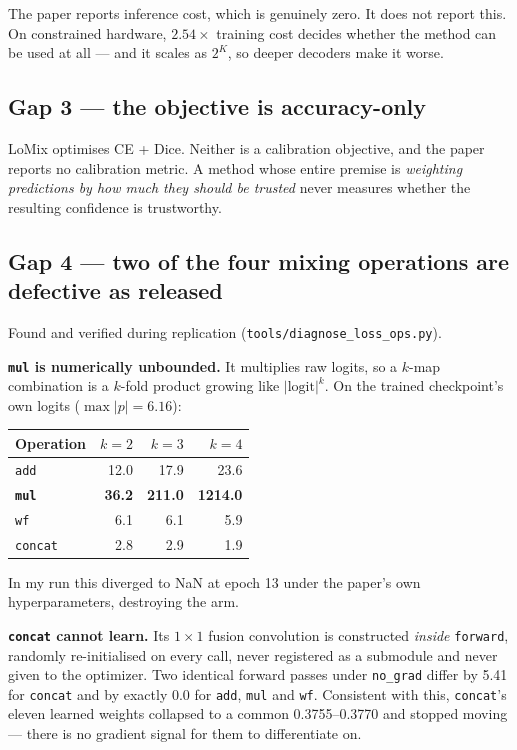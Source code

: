 \documentclass[11pt,a4paper]{article}
\newcommand{\code}[1]{\texttt{\small #1}}
\begin{document}
The paper reports inference cost, which is genuinely zero. It does not report
this. On constrained hardware, $2.54\times$ training cost decides whether the
method can be used at all --- and it scales as $2^K$, so deeper decoders make it
worse.

\subsection{Gap 3 --- the objective is accuracy-only}

LoMix optimises CE + Dice. Neither is a calibration objective, and the paper
reports no calibration metric. A method whose entire premise is \emph{weighting
predictions by how much they should be trusted} never measures whether the
resulting confidence is trustworthy.

\subsection{Gap 4 --- two of the four mixing operations are defective as released}

Found and verified during replication (\code{tools/diagnose\_loss\_ops.py}).

\textbf{\code{mul} is numerically unbounded.} It multiplies raw logits, so a
$k$-map combination is a $k$-fold product growing like $|\text{logit}|^k$. On
the trained checkpoint's own logits ($\max|p| = 6.16$):

\begin{center}
\begin{tabular}{@{}lrrr@{}}
\toprule
\textbf{Operation} & $k=2$ & $k=3$ & $k=4$ \\
\midrule
\code{add} & 12.0 & 17.9 & 23.6 \\
\textbf{\code{mul}} & \textbf{36.2} & \textbf{211.0} & \textbf{1214.0} \\
\code{wf} & 6.1 & 6.1 & 5.9 \\
\code{concat} & 2.8 & 2.9 & 1.9 \\
\bottomrule
\end{tabular}
\end{center}

In my run this diverged to NaN at epoch 13 under the paper's own
hyperparameters, destroying the arm.

\textbf{\code{concat} cannot learn.} Its $1\times1$ fusion convolution is
constructed \emph{inside} \code{forward}, randomly re-initialised on every call,
never registered as a submodule and never given to the optimizer. Two identical
forward passes under \code{no\_grad} differ by 5.41 for \code{concat} and by
exactly 0.0 for \code{add}, \code{mul} and \code{wf}. Consistent with this,
\code{concat}'s eleven learned weights collapsed to a common 0.3755--0.3770 and
stopped moving --- there is no gradient signal for them to differentiate on.
\end{document}
